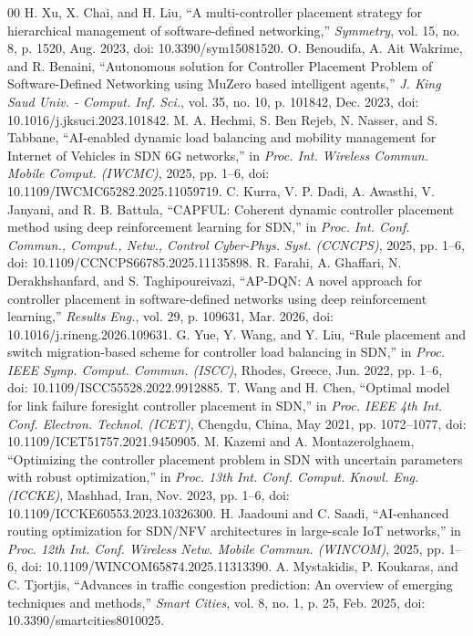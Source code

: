 \documentclass[conference]{IEEEtran}
\begin{document}
\begin{thebibliography}{00}
 H. Xu, X. Chai, and H. Liu, ``A multi-controller placement strategy for hierarchical management of software-defined networking,'' \textit{Symmetry}, vol. 15, no. 8, p. 1520, Aug. 2023, doi: 10.3390/sym15081520.
 O. Benoudifa, A. Ait Wakrime, and R. Benaini, ``Autonomous solution for Controller Placement Problem of Software-Defined Networking using MuZero based intelligent agents,'' \textit{J. King Saud Univ. - Comput. Inf. Sci.}, vol. 35, no. 10, p. 101842, Dec. 2023, doi: 10.1016/j.jksuci.2023.101842.
 M. A. Hechmi, S. Ben Rejeb, N. Nasser, and S. Tabbane, ``AI-enabled dynamic load balancing and mobility management for Internet of Vehicles in SDN 6G networks,'' in \textit{Proc. Int. Wireless Commun. Mobile Comput. (IWCMC)}, 2025, pp. 1--6, doi: 10.1109/IWCMC65282.2025.11059719.
 C. Kurra, V. P. Dadi, A. Awasthi, V. Janyani, and R. B. Battula, ``CAPFUL: Coherent dynamic controller placement method using deep reinforcement learning for SDN,'' in \textit{Proc. Int. Conf. Commun., Comput., Netw., Control Cyber-Phys. Syst. (CCNCPS)}, 2025, pp. 1--6, doi: 10.1109/CCNCPS66785.2025.11135898.
 R. Farahi, A. Ghaffari, N. Derakhshanfard, and S. Taghipoureivazi, ``AP-DQN: A novel approach for controller placement in software-defined networks using deep reinforcement learning,'' \textit{Results Eng.}, vol. 29, p. 109631, Mar. 2026, doi: 10.1016/j.rineng.2026.109631.
 G. Yue, Y. Wang, and Y. Liu, ``Rule placement and switch migration-based scheme for controller load balancing in SDN,'' in \textit{Proc. IEEE Symp. Comput. Commun. (ISCC)}, Rhodes, Greece, Jun. 2022, pp. 1--6, doi: 10.1109/ISCC55528.2022.9912885.
 T. Wang and H. Chen, ``Optimal model for link failure foresight controller placement in SDN,'' in \textit{Proc. IEEE 4th Int. Conf. Electron. Technol. (ICET)}, Chengdu, China, May 2021, pp. 1072--1077, doi: 10.1109/ICET51757.2021.9450905.
 M. Kazemi and A. Montazerolghaem, ``Optimizing the controller placement problem in SDN with uncertain parameters with robust optimization,'' in \textit{Proc. 13th Int. Conf. Comput. Knowl. Eng. (ICCKE)}, Mashhad, Iran, Nov. 2023, pp. 1--6, doi: 10.1109/ICCKE60553.2023.10326300.
 H. Jaadouni and C. Saadi, ``AI-enhanced routing optimization for SDN/NFV architectures in large-scale IoT networks,'' in \textit{Proc. 12th Int. Conf. Wireless Netw. Mobile Commun. (WINCOM)}, 2025, pp. 1--6, doi: 10.1109/WINCOM65874.2025.11313390.
 A. Mystakidis, P. Koukaras, and C. Tjortjis, ``Advances in traffic congestion prediction: An overview of emerging techniques and methods,'' \textit{Smart Cities}, vol. 8, no. 1, p. 25, Feb. 2025, doi: 10.3390/smartcities8010025.
\end{thebibliography}
\end{document}

